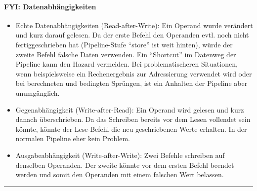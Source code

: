 \paragraph{FYI: Datenabhängigkeiten}
		\begin{itemize}
			\item Echte Datenabhängigkeiten (Read-after-Write): Ein Operand wurde verändert und kurz darauf gelesen. Da der erste Befehl den Operanden evtl. noch nicht fertiggeschrieben hat (Pipeline-Stufe "`store"' ist weit hinten), würde der zweite Befehl falsche Daten verwenden. Ein "`Shortcut"' im Datenweg der Pipeline kann den Hazard vermeiden. Bei problematischeren Situationen, wenn beispielsweise ein Rechenergebnis zur Adressierung verwendet wird oder bei berechneten und bedingten Sprüngen, ist ein Anhalten der Pipeline aber unumgänglich.
			\item Gegenabhängigkeit (Write-after-Read): Ein Operand wird gelesen und kurz danach überschrieben. Da das Schreiben bereits vor dem Lesen vollendet sein könnte, könnte der Lese-Befehl die neu geschriebenen Werte erhalten. In der normalen Pipeline eher kein Problem.
			\item Ausgabeabhängigkeit (Write-after-Write): Zwei Befehle schreiben auf denselben Operanden. Der zweite könnte vor dem ersten Befehl beendet werden und somit den Operanden mit einem falschen Wert belassen.
		\end{itemize}
\par\noindent\rule{\textwidth}{0.4pt}

